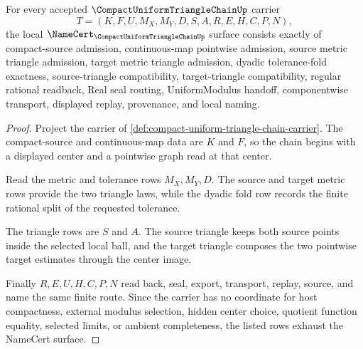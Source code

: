 \begin{theorem}
\label{thm:compact-uniform-triangle-chain-namecert-obligations}
For every accepted $\CompactUniformTriangleChainUp$ carrier
$$
T=(K,F,U,M_X,M_Y,D,S,A,R,E,H,C,P,N),
$$
the local $\NameCert_{\CompactUniformTriangleChainUp}$ surface consists exactly of compact-source admission, continuous-map pointwise admission, source metric triangle admission, target metric triangle admission, dyadic tolerance-fold exactness, source-triangle compatibility, target-triangle compatibility, regular rational readback, Real seal routing, UniformModulus handoff, componentwise transport, displayed replay, provenance, and local naming.
\end{theorem}
\begin{proof}
Project the carrier of \autoref{def:compact-uniform-triangle-chain-carrier}. The compact-source and continuous-map data are $K$ and $F$, so the chain begins with a displayed center and a pointwise graph read at that center.

Read the metric and tolerance rows $M_X,M_Y,D$. The source and target metric rows provide the two triangle laws, while the dyadic fold row records the finite rational split of the requested tolerance.

The triangle rows are $S$ and $A$. The source triangle keeps both source points inside the selected local ball, and the target triangle composes the two pointwise target estimates through the center image.

Finally $R,E,U,H,C,P,N$ read back, seal, export, transport, replay, source, and name the same finite route. Since the carrier has no coordinate for host compactness, external modulus selection, hidden center choice, quotient function equality, selected limits, or ambient completeness, the listed rows exhaust the NameCert surface.
\end{proof}


